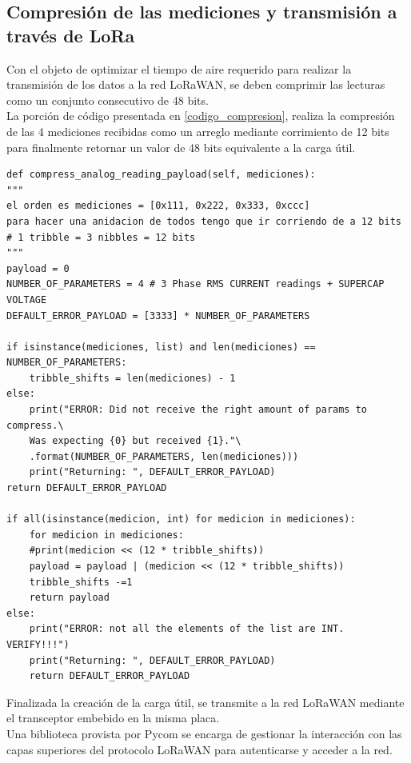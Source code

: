 \subsection{Compresión de las mediciones y transmisión a través de LoRa}\label{compresion_lecturas}
Con el objeto de optimizar el tiempo de aire requerido para realizar la transmisión de los datos a la red LoRaWAN, se deben comprimir las lecturas como un conjunto consecutivo de 48 bits.\\
La porción de código presentada en \ref{codigo_compresion}, realiza la compresión de las 4 mediciones recibidas como un arreglo mediante corrimiento de 12 bits para finalmente retornar un valor de 48 bits equivalente a la carga útil.\\

\begin{lstlisting}[label=codigo_compresion,caption=Función encargada de comprimir las 4 lecturas de 12 bits.]
def compress_analog_reading_payload(self, mediciones):
"""
el orden es mediciones = [0x111, 0x222, 0x333, 0xccc]
para hacer una anidacion de todos tengo que ir corriendo de a 12 bits
# 1 tribble = 3 nibbles = 12 bits
"""
payload = 0
NUMBER_OF_PARAMETERS = 4 # 3 Phase RMS CURRENT readings + SUPERCAP VOLTAGE
DEFAULT_ERROR_PAYLOAD = [3333] * NUMBER_OF_PARAMETERS

if isinstance(mediciones, list) and len(mediciones) == NUMBER_OF_PARAMETERS:
	tribble_shifts = len(mediciones) - 1
else:
	print("ERROR: Did not receive the right amount of params to compress.\
	Was expecting {0} but received {1}."\
	.format(NUMBER_OF_PARAMETERS, len(mediciones)))
	print("Returning: ", DEFAULT_ERROR_PAYLOAD)
return DEFAULT_ERROR_PAYLOAD

if all(isinstance(medicion, int) for medicion in mediciones):
	for medicion in mediciones:
	#print(medicion << (12 * tribble_shifts))
	payload = payload | (medicion << (12 * tribble_shifts))
	tribble_shifts -=1
	return payload
else:
	print("ERROR: not all the elements of the list are INT. VERIFY!!!")
	print("Returning: ", DEFAULT_ERROR_PAYLOAD)
	return DEFAULT_ERROR_PAYLOAD
\end{lstlisting}

Finalizada la creación de la carga útil, se transmite a la red LoRaWAN mediante el transceptor embebido en la misma placa.\\
Una biblioteca provista por Pycom se encarga de gestionar la interacción con las capas superiores del protocolo LoRaWAN para autenticarse y acceder a la red.\\

